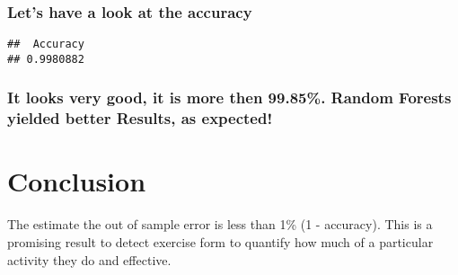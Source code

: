 \documentclass[]{article}
\newenvironment{Shaded}{\begin{snugshade}}{\end{snugshade}}
\newcommand{\DecValTok}[1]{\textcolor[rgb]{0.00,0.00,0.81}{{#1}}}
\newcommand{\CommentTok}[1]{\textcolor[rgb]{0.56,0.35,0.01}{\textit{{#1}}}}
\newcommand{\NormalTok}[1]{{#1}}
\begin{document}
\subsubsection{Let's have a look at the
accuracy}\label{lets-have-a-look-at-the-accuracy}

\begin{Shaded}
\end{Shaded}

\begin{verbatim}
##  Accuracy 
## 0.9980882
\end{verbatim}

\subsubsection{It looks very good, it is more then 99.85\%. Random
Forests yielded better Results, as
expected!}\label{it-looks-very-good-it-is-more-then-99.85.-random-forests-yielded-better-results-as-expected}

\section{Conclusion}\label{conclusion}

The estimate the out of sample error is less than 1\% (1 - accuracy).
This is a promising result to detect exercise form to quantify how much
of a particular activity they do and effective.
\end{document}
